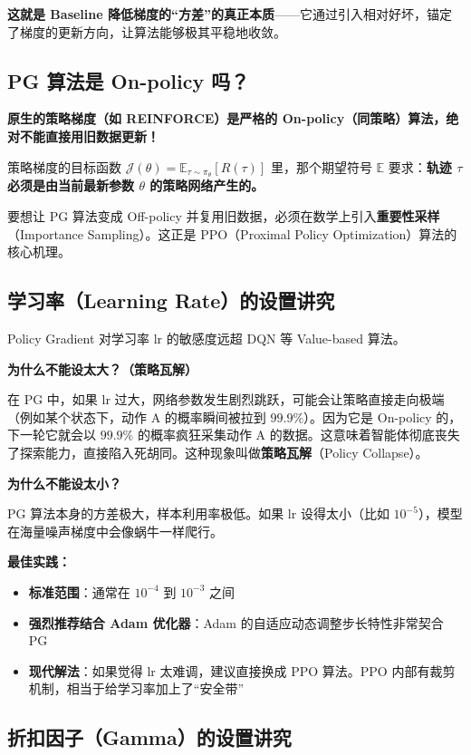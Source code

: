 \documentclass[12pt,a4paper]{article}
\newcommand{\E}{\mathbb{E}}
\theoremstyle{noteplain}
\theoremstyle{noteexercise}
\begin{document}
\textbf{这就是 Baseline 降低梯度的``方差''的真正本质}——它通过引入相对好坏，锚定了梯度的更新方向，让算法能够极其平稳地收敛。

\subsection{PG 算法是 On-policy 吗？}\label{ssec:on-policy}

\textbf{原生的策略梯度（如 REINFORCE）是严格的 On-policy（同策略）算法，绝对不能直接用旧数据更新！}

策略梯度的目标函数 $\mathcal{J}(\theta) = \E_{\tau\sim\pi_\theta}[R(\tau)]$ 里，那个期望符号 $\E$ 要求：\textbf{轨迹 $\tau$ 必须是由当前最新参数 $\theta$ 的策略网络产生的。}

要想让 PG 算法变成 Off-policy 并复用旧数据，必须在数学上引入\textbf{重要性采样}（Importance Sampling）。这正是 PPO（Proximal Policy Optimization）算法的核心机理。

\subsection{学习率（Learning Rate）的设置讲究}\label{ssec:lr}

Policy Gradient 对学习率 lr 的敏感度远超 DQN 等 Value-based 算法。

\textbf{为什么不能设太大？（策略瓦解）}

在 PG 中，如果 lr 过大，网络参数发生剧烈跳跃，可能会让策略直接走向极端（例如某个状态下，动作 A 的概率瞬间被拉到 $99.9\%$）。因为它是 On-policy 的，下一轮它就会以 $99.9\%$ 的概率疯狂采集动作 A 的数据。这意味着智能体彻底丧失了探索能力，直接陷入死胡同。这种现象叫做\textbf{策略瓦解}（Policy Collapse）。

\textbf{为什么不能设太小？}

PG 算法本身的方差极大，样本利用率极低。如果 lr 设得太小（比如 $10^{-5}$），模型在海量噪声梯度中会像蜗牛一样爬行。

\textbf{最佳实践：}
\begin{itemize}
  \setlength{\itemsep}{0.2em}
  \item \textbf{标准范围}：通常在 $10^{-4}$ 到 $10^{-3}$ 之间
  \item \textbf{强烈推荐结合 Adam 优化器}：Adam 的自适应动态调整步长特性非常契合 PG
  \item \textbf{现代解法}：如果觉得 lr 太难调，建议直接换成 PPO 算法。PPO 内部有裁剪机制，相当于给学习率加上了``安全带''
\end{itemize}

\subsection{折扣因子（Gamma）的设置讲究}\label{ssec:gamma}
\end{document}
